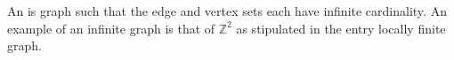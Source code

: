 \documentclass[12pt]{article}
\begin{document}
An  is graph such that the edge and vertex sets each have infinite cardinality.  An example of an infinite graph is that of $\mathbb{Z}^2$ as stipulated in the entry locally finite graph.
\end{document}
